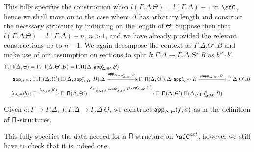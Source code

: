 \begin{construction}
  This fully specifies the construction when
  $l(\Gamma.\Delta.\Theta)=l(\Gamma.\Delta)+1$ in $\sfC$, hence we shall move on
  to the case where $\Delta$ has arbitrary length and construct the necessary
  structure by inducting on the length of $\Theta$. Suppose then that
  $l(\Gamma.\Delta.\Theta)=l(\Gamma.\Delta)+n$, $n>1$, and we have already
  provided the relevant constructions up to $n-1$. We again decompose
  the context as $\Gamma.\Delta.\Theta'.B$ and make use of our assumption on
  sections to split $b\colon\Gamma.\Delta\rightarrow\Gamma.\Delta.\Theta'.B$ as
  $b''\cdot b'$.
  \begin{align*}
    \Gamma.\operatorname{\mathsf{\Pi}}(\Delta,\Theta)
    &=\Gamma.\operatorname{\mathsf{\Pi}}(\Delta,\Theta'.B)=\Gamma.\Pi(\Delta,\operatorname{\mathsf{app}}^*_{\Delta,\Theta'}B) \\
    \operatorname{\mathsf{app}}_{\Delta,\Theta}
    &\colon\Gamma.\operatorname{\mathsf{\Pi}}(\Delta,\Theta').\Pi(\Delta,\operatorname{\mathsf{app}}^*_{\Delta,\Theta'}B).\Delta
    \xrightarrow{\operatorname{\mathsf{app}}_{\Delta,\operatorname{\mathsf{app}}^*_{\Delta,\Theta'}B}}
    \Gamma.\operatorname{\mathsf{\Pi}}(\Delta,\Theta').\Delta.\operatorname{\mathsf{app}}^*_{\Delta,\Theta'}B
    \xrightarrow{q(\operatorname{\mathsf{app}}_{\Delta,\Theta'},B)}
    \Gamma.\Delta.\Theta'.B \\
    \lambda_{\Delta,\Theta}(b)
    &\colon\Gamma
    \xrightarrow{\lambda_{\Delta,\Theta'}(b')}
    \Gamma.\operatorname{\mathsf{\Pi}}(\Delta,\Theta')
    \xrightarrow{\lambda_{p^*_{\operatorname{\mathsf{\Pi}}(\Delta,\Theta')}\Delta,\operatorname{\mathsf{app}}^*_{\Delta,\Theta'}B}(\operatorname{\mathsf{app}}_{\Delta,\Theta'}^*b'')}
    \Gamma.\operatorname{\mathsf{\Pi}}(\Delta,\Theta').\Pi(\Delta,\operatorname{\mathsf{app}}^*_{\Delta,\Theta'}B)
  \end{align*}

  Given $a\colon\Gamma\rightarrow\Gamma.\Delta$,
  $f\colon\Gamma.\Delta\rightarrow\Gamma.\Delta.\Theta$, we construct
  $\operatorname{\mathsf{app}}_{\Delta,\Theta}(f,a)$ as in the definition of $\operatorname{\mathsf{\Pi}}$-structures.

  This fully specifies the data needed for a $\operatorname{\mathsf{\Pi}}$-structure on $\sfC^{cxt}$,
  however we still have to check that it is indeed one.
\end{construction}


